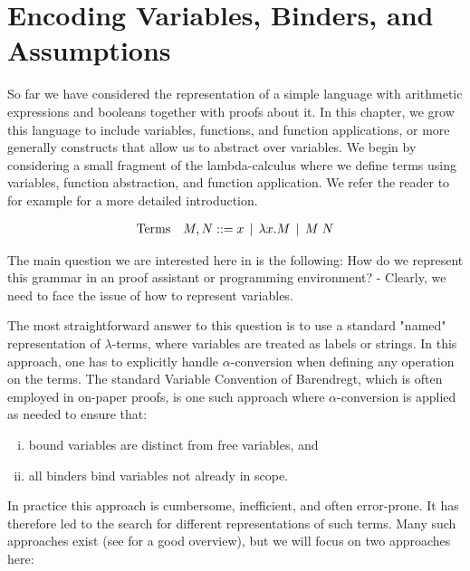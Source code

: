 \chapter{Encoding Variables, Binders, and Assumptions}
\label{chap:binders}
So far we have considered the representation of a simple language with
arithmetic expressions and booleans together with proofs about it. In this
chapter, we grow this language to include variables, functions, and function applications,
or more generally constructs that allow us to abstract over
variables. We begin by considering a small fragment of the
lambda-calculus where we define terms using variables, function
abstraction, and function application. We refer the reader to for
example \citep[Ch 5]{TAPL} for a more detailed introduction.

\[
\begin{array}{ll@{\bnfas}l}
\mbox{Terms} & M, N & x \bnfalt \lam x.M \bnfalt M \app N
\end{array}
\]

The main question we are interested here in is the following: How do we
represent this grammar in an proof assistant or programming environment? - Clearly, we need to
face the issue of how to represent variables.

The most straightforward answer to this question is to use a standard "named" representation of
$\lambda$-terms, where variables are treated as labels or strings. In
this approach, one has to explicitly handle $\alpha$-conversion when
defining any operation on the terms. The standard Variable Convention
of Barendregt, which is often employed in on-paper proofs, is one such
approach where $\alpha$-conversion is applied as needed to ensure
that:

\begin{enumerate}[(i)]
\item bound variables are distinct from free variables, and
\item all binders bind variables not already in scope.
\end{enumerate}

In practice this approach is cumbersome, inefficient, and often error-prone. It
has therefore led to the search for different representations of such
terms. Many such approaches exist (see \cite{Aydemir:TechReport09} for
a good overview), but we will focus on two approaches here:

